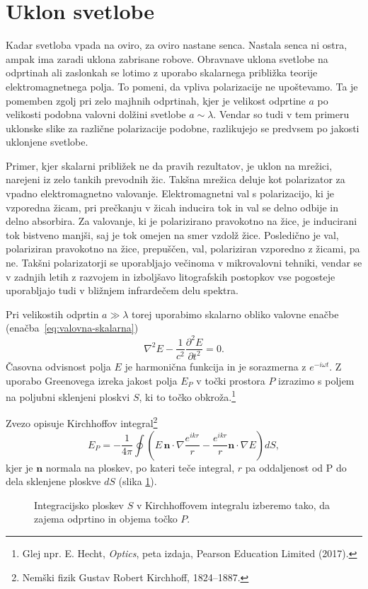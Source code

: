\section{Uklon svetlobe}
Kadar svetloba vpada na oviro, za oviro nastane senca. Nastala senca ni ostra, ampak
ima zaradi uklona zabrisane robove. Obravnave 
uklona svetlobe na odprtinah ali zaslonkah se lotimo z uporabo
skalarnega približka teorije elektromagnetnega polja. To pomeni, da vpliva 
polarizacije ne upoštevamo. Ta je pomemben zgolj pri zelo majhnih odprtinah, 
kjer je velikost odprtine $a$ po velikosti podobna valovni dolžini svetlobe $a \sim \lambda$. 
Vendar so tudi v tem primeru uklonske slike za različne polarizacije podobne, 
razlikujejo se predvsem po jakosti uklonjene svetlobe.
\begin{remark}
Primer, kjer skalarni približek ne da pravih rezultatov, je uklon na mrežici, narejeni 
iz zelo tankih prevodnih žic. Takšna mrežica deluje kot polarizator za vpadno elektromagnetno valovanje.
Elektromagnetni val s polarizacijo, ki je vzporedna žicam, pri prečkanju v žicah inducira tok
in val se delno odbije in delno absorbira. Za valovanje, ki je polarizirano pravokotno 
na žice, je  inducirani tok bistveno manjši, saj je tok omejen na smer
vzdolž žice. Posledično je val, polariziran pravokotno na žice, prepuščen, 
val, polariziran vzporedno z žicami, pa ne. 
Takšni polarizatorji se uporabljajo večinoma v mikrovalovni tehniki, 
vendar se v zadnjih letih z razvojem in izboljšavo litografskih postopkov
vse pogosteje uporabljajo tudi v bližnjem infrardečem delu spektra.
\end{remark}

Pri velikostih odprtin $a\gg\lambda$ torej uporabimo skalarno obliko valovne enačbe 
(enačba~\ref{eq:valovna-skalarna})
\begin{equation}
\nabla^2 E - \frac{1}{c^2}\frac{\partial^2 E}{\partial t^2} = 0.
\label{eq:skalarna-valovna-enačba}
\end{equation}
Časovna odvisnost polja $E$ je harmonična funkcija in 
je sorazmerna z $e^{-i \omega t}$. Z uporabo Greeno\-ve\-ga izreka 
jakost polja $E_P$ v točki prostora $P$ izrazimo s poljem na 
poljubni sklenjeni ploskvi $S$, ki to točko obkroža.\footnote{Glej npr. 
E. Hecht, {\it Optics}, peta izdaja, Pearson Education Limited (2017).} 

Zvezo opisuje Kirchhoffov integral\footnote{Nemški fizik Gustav Robert Kirchhoff, 1824--1887.} 
\begin{equation}
E_P = -\frac{1}{4\pi}\oint \left(E\,\mathbf{n}\cdot \nabla \frac{e^{ikr}}{r}-
\frac{e^{ikr}}{r}\mathbf{n}\cdot \nabla E \right) dS,
\label{eq:Kirchhoffov-integral}
\end{equation}
kjer je $\mathbf{n}$ normala na ploskev, po kateri teče integral, $r$ pa oddaljenost od P
do dela sklenjene ploskve $dS$ (slika \ref{fig:UklonFK}). 
\begin{figure}[h]
\centering {} 
  
\caption{Integracijsko ploskev $S$ v Kirchhoffovem integralu izberemo tako, da zajema odprtino 
in objema točko $P$.}
\label{fig:UklonFK}
\end{figure}

